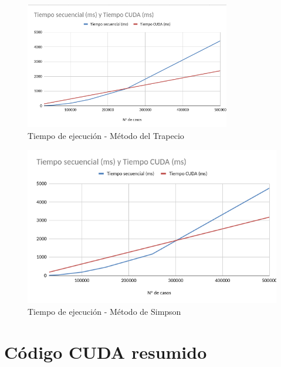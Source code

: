 \documentclass[12pt]{article}
\begin{document}
\begin{figure}[h]
    \centering
    \includegraphics[width=0.8\textwidth]{captura3.png}
    \caption{Tiempo de ejecución - Método del Trapecio}
\end{figure}

\begin{figure}[h]
    \centering
    \includegraphics[width=0.75\linewidth]{captura4.png}
    \caption{Tiempo de ejecución - Método de Simpson}
\end{figure}

\newpage

\section*{Código CUDA resumido}
\end{document}
